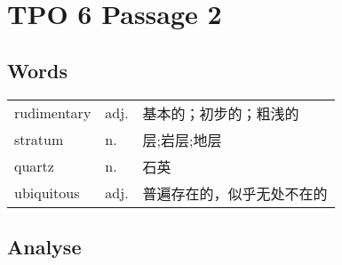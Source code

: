 \section{TPO 6 Passage 2}

\subsection{Words}

\begin{tabular}{lll}
    rudimentary & adj. & 基本的；初步的；粗浅的   \\
    stratum     & n.   & 层;岩层;地层       \\
    quartz      & n.   & 石英            \\
    ubiquitous  & adj. & 普遍存在的，似乎无处不在的 \\
\end{tabular}

\subsection{Analyse}

